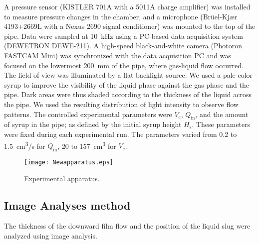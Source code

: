 \documentclass[aps,pre,preprint,groupedaddress,showkeys]{revtex4-2}
\begin{document}
A pressure sensor (KISTLER 701A with a 5011A charge amplifier) was installed to measure pressure changes in the chamber, and a microphone (Br\"uel-Kj\ae r 4193+2669L with a Nexus 2690 signal conditioner) was mounted to the top of the pipe. 
Data were sampled at \SI{10}{kHz} using a PC-based data acquisition system (DEWETRON DEWE-211).
A high-speed black-and-white camera (Photoron FASTCAM Mini) was synchronized with the data acquisition PC and was focused on the lowermost \SI{200}{\mm} of the pipe, where gas-liquid flow occurred.
The field of view was illuminated by a flat backlight source. We used a pale-color syrup to improve the visibility of the liquid phase against the gas phase and the pipe. 
Dark areas were thus shaded according to the thickness of the liquid across the pipe. 
We used the resulting distribution of light intensity to observe flow patterns.
The controlled experimental parameters were $V_\mathrm{c}$, $Q_\mathrm{in}$, and the amount of syrup in the pipe; as defined by the initial syrup height $H_\mathrm{s}$. 
These parameters were fixed during each experimental run. 
The parameters varied from 0.2 to \SI{1.5}{cm^3/s} for $Q_\mathrm{in}$, 20 to \SI{157} {\cm^3} for $V_\mathrm{c}$.

\begin{figure}
\texttt{[image: Newapparatus.eps]}%
\caption{\label{Apparatus} Experimental apparatus.}
\end{figure}

\subsection{Image Analyses method}\label{ime}
The thickness of the downward film flow and the position of the liquid slug were analyzed using image analysis.
\end{document}
